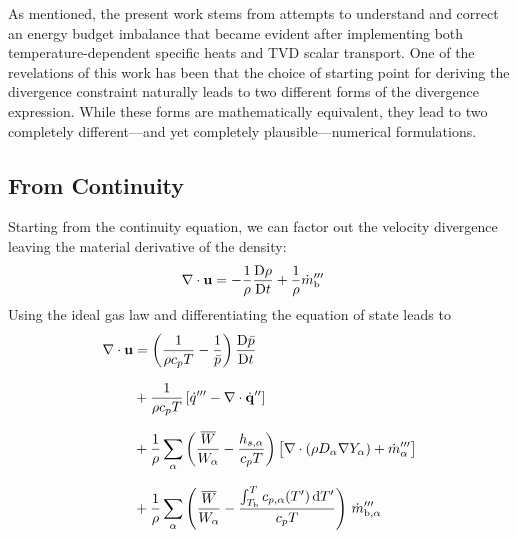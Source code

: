 As mentioned, the present work stems from attempts to understand and correct an energy budget imbalance that became evident after implementing both temperature-dependent specific heats and TVD scalar transport. One of the revelations of this work has been that the choice of starting point for deriving the divergence constraint naturally leads to two different forms of the divergence expression.  While these forms are mathematically equivalent, they lead to two completely different---and yet completely plausible---numerical formulations.

\subsection{From Continuity}
Starting from the continuity equation, we can factor out the velocity divergence leaving the material derivative of the density:
\begin{align}
\nabla\cdot\mathbf{u} &= -\frac{1}{\rho}\frac{\mbox{D}\rho}{\mbox{D} t} + \frac{1}{\rho} \dot{m}_{\rm b}'''
\end{align}
Using the ideal gas law and differentiating the equation of state leads to
\begin{align}
\label{eqn_div_1}
\nabla\cdot\mathbf{u} &= \left(\frac{1}{\rho c_p T} - \frac{1}{\bar{p}} \right)\frac{\mbox{D} \bar{p}}{\mbox{D} t} \notag\\[.1in]
&+ \frac{1}{\rho c_p T} \left[ \dot{q}^{\prime\prime\prime} - \nabla\cdot \dot{\mathbf{q}}^{\prime\prime} \right] \notag\\[.1in]
&+ \frac{1}{\rho} \sum_\alpha \left(\frac{\overline{W}}{W_\alpha} - \frac{h_{s,\alpha}}{c_p T} \right) \big[ \nabla\cdot (\rho D_\alpha \nabla Y_\alpha) + \dot{m}_\alpha^{\prime\prime\prime} \big] \notag \\[.1in]
&+ \frac{1}{\rho} \sum_\alpha \left(\frac{\overline{W}}{W_\alpha} - \frac{\int_{T_{\rm b}}^T c_{p,\alpha}(T') \, {\rm d}T'}{c_p T} \right) \, \dot{m}_{\rm b,\alpha}^{\prime\prime\prime}
\end{align}

